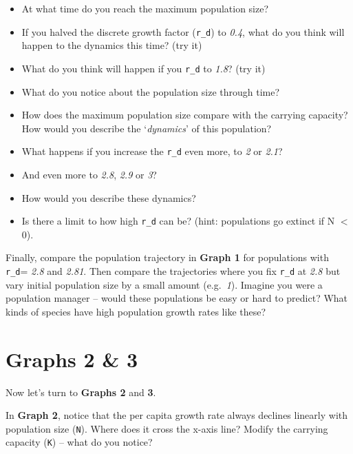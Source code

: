 \documentclass[
  a4paper]{book}
\providecommand{\tightlist}{%
  \setlength{\itemsep}{0pt}\setlength{\parskip}{0pt}}
\begin{document}
\begin{itemize}
\tightlist
\item
  At what time do you reach the maximum population size?
\item
  If you halved the discrete growth factor (\texttt{r\_d}) to
  \emph{0.4}, what do you think will happen to the dynamics this time?
  (try it)
\end{itemize}

\begin{itemize}
\tightlist
\item
  What do you think will happen if you \texttt{r\_d} to \emph{1.8}? (try
  it)
\item
  What do you notice about the population size through time?
\item
  How does the maximum population size compare with the carrying
  capacity? How would you describe the `\emph{dynamics}' of this
  population?
\end{itemize}

\begin{itemize}
\tightlist
\item
  What happens if you increase the \texttt{r\_d} even more, to \emph{2}
  or \emph{2.1}?
\item
  And even more to \emph{2.8}, \emph{2.9} or \emph{3}?
\item
  How would you describe these dynamics?
\item
  Is there a limit to how high \texttt{r\_d} can be? (hint: populations
  go extinct if N \(<\) 0).
\end{itemize}

Finally, compare the population trajectory in \textbf{Graph 1} for
populations with \texttt{r\_d}= \emph{2.8} and \emph{2.81}. Then compare
the trajectories where you fix \texttt{r\_d} at \emph{2.8} but vary
initial population size by a small amount (e.g.~\emph{1}). Imagine you
were a population manager -- would these populations be easy or hard to
predict? What kinds of species have high population growth rates like
these?

\hypertarget{graphs-2-3}{%
\section{Graphs 2 \& 3}\label{graphs-2-3}}

Now let's turn to \textbf{Graphs 2} and \textbf{3}.

In \textbf{Graph 2}, notice that the per capita growth rate always
declines linearly with population size (\texttt{N}). Where does it cross
the x-axis line? Modify the carrying capacity (\texttt{K}) -- what do
you notice?
\end{document}
